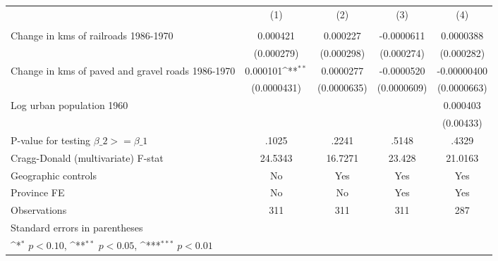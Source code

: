 {
\def\sym#1{\ifmmode^{#1}\else\(^{#1}\)\fi}
\begin{tabular}{l*{4}{c}}
\hline\hline
                &\multicolumn{1}{c}{(1)}&\multicolumn{1}{c}{(2)}&\multicolumn{1}{c}{(3)}&\multicolumn{1}{c}{(4)}\\
                &\multicolumn{1}{c}{}&\multicolumn{1}{c}{}&\multicolumn{1}{c}{}&\multicolumn{1}{c}{}\\
\hline
Change in kms of railroads 1986-1970& 0.000421         & 0.000227         &-0.0000611         &0.0000388         \\
                &(0.000279)         &(0.000298)         &(0.000274)         &(0.000282)         \\
[1em]
Change in kms of paved and gravel roads 1986-1970& 0.000101\sym{**} &0.0000277         &-0.0000520         &-0.00000400         \\
                &(0.0000431)         &(0.0000635)         &(0.0000609)         &(0.0000663)         \\
[1em]
Log urban population 1960&                  &                  &                  & 0.000403         \\
                &                  &                  &                  &(0.00433)         \\
\hline
P-value for testing $\beta\_{2} >= \beta\_{1}$&    .1025         &    .2241         &    .5148         &    .4329         \\
Cragg-Donald (multivariate) F-stat&  24.5343         &  16.7271         &   23.428         &  21.0163         \\
Geographic controls&       No         &      Yes         &      Yes         &      Yes         \\
Province FE     &       No         &       No         &      Yes         &      Yes         \\
Observations    &      311         &      311         &      311         &      287         \\
\hline\hline
\multicolumn{5}{l}{\footnotesize Standard errors in parentheses}\\
\multicolumn{5}{l}{\footnotesize \sym{*} \(p<0.10\), \sym{**} \(p<0.05\), \sym{***} \(p<0.01\)}\\
\end{tabular}
}

